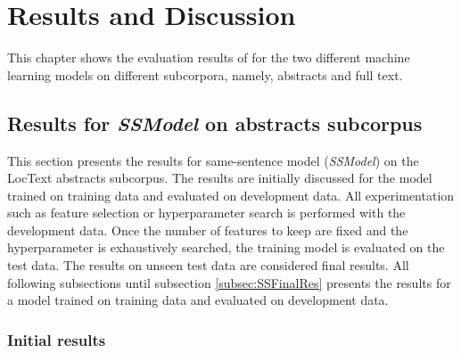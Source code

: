 \chapter{Results and Discussion}\label{chapter:results}

This chapter shows the evaluation results of for the two different machine learning models on different subcorpora, namely, abstracts and full text.

\section{Results for \textit{SSModel} on abstracts subcorpus}

This section presents the results for same-sentence model (\textit{SSModel}) on the LocText abstracts subcorpus. The results are initially discussed for the model trained on training data and evaluated on development data. All experimentation such as feature selection or hyperparameter search is performed with the development data. Once the number of features to keep are fixed and the hyperparameter is exhaustively searched, the training model is evaluated on the test data. The results on unseen test data are considered final results. All following subsections until subsection \ref{subsec:SSFinalRes} presents the results for a model trained on training data and evaluated on development data.


\subsection{Initial results}

